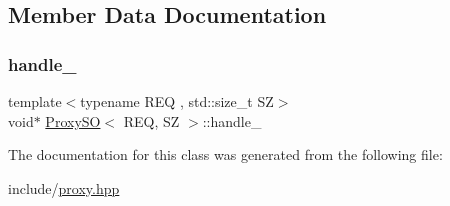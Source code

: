 \subsection{Member Data Documentation}
\mbox{\label{classProxySO_a8db0f87ceb9dc54bd30b212394a74d09}} 
\subsubsection{\texorpdfstring{handle\+\_\+}{handle\_}}
{\footnotesize\ttfamily template$<$typename R\+EQ , std\+::size\+\_\+t SZ$>$ \\
void$\ast$ \hyperlink{classProxySO}{Proxy\+SO}$<$ R\+EQ, SZ $>$\+::handle\+\_\+\hspace{0.3cm}{\ttfamily [private]}}



The documentation for this class was generated from the following file\+:\begin{DoxyCompactItemize}
\item 
include/\hyperlink{proxy_8hpp}{proxy.\+hpp}\end{DoxyCompactItemize}
